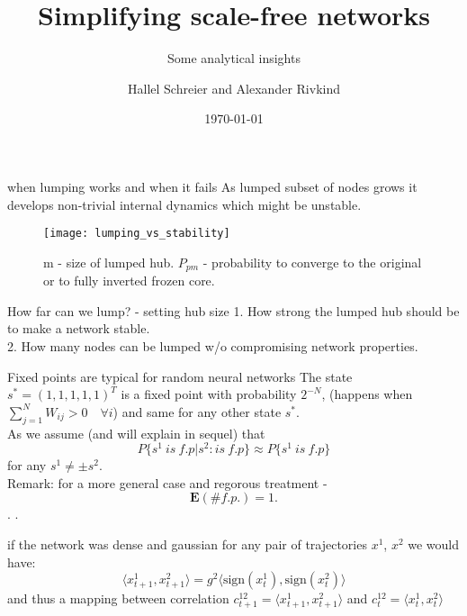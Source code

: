 \documentclass[xcolor=x11names,compress]{beamer}
\renewcommand{\(}{\begin{columns}}
\renewcommand{\)}{\end{columns}}
\newcommand{\<}[1]{\begin{column}{#1}}
\renewcommand{\>}{\end{column}}
\newcommand{\sign}{\mathrm{sign}}
\begin{document}
	
	
	\begin{frame}{}
		\title{Simplifying scale-free networks}
		\subtitle[short]{Some analytical insights}
		\author{
			Hallel Schreier and Alexander Rivkind}
		\date{\today}
		\titlepage
	\end{frame}
	
	
	\begin{frame}{when lumping works and when it fails}
	 As lumped subset of nodes grows it develops non-trivial internal dynamics which might be unstable.
		 \begin{figure}
		\centering
		\texttt{[image: lumping\_vs\_stability]}
		\caption[Stability of frozen core]{m - size of lumped hub. $P_{pm}$ - probability to converge to the original or to fully inverted frozen core.}
		\label{fig:lumpingvsstability}
		\end{figure}
  	\end{frame}
	
	\begin{frame}[t]{How far can we lump?  - setting hub size}
		1. How strong the lumped hub should be to make a network stable.\\
		2. How many nodes can be lumped w/o compromising network properties. 
	\end{frame}	
	
	\begin{frame}[t]{Fixed points are typical for random neural networks}
		The state $s^*=(1,1,1,1,1)^T$ is a fixed point with probability $2^{-N}$, (happens when $\sum_{j=1}^{N} W_{ij}  >0 \quad \forall i $) and same for any other state $s^*$. \\
		As we assume (and will explain in sequel) that \[P\{s^1\:is\:f.p|s^2:is\:f.p \} \approx P\{s^1\:is\:f.p \}\] for any $s^1\ne\pm s^2$.\\
		Remark: for a more general case and regorous treatment - 
		 \[ \mathbf{E}(\#f.p.)=1.\]. 
		 \cite{mori_PhysRevLett.119.028301}.\\
	\end{frame}
	
	\begin{frame}[t]{if the network was dense and gaussian}
		for any pair of trajectories $x^1$, $x^2$ we would have:
		\[
		\langle
		x^{1}_{t+1},x^{2}_{t+1}
		\rangle
		=g^2
		\langle
		\sign (x^{1}_{t}),\sign(x^{2}_{t})
		\rangle
		\] 
		and thus a mapping between correlation $c^{12}_{t+1}=\langle x^{1}_{t+1},x^{2}_{t+1}\rangle$ and $c^{12}_{t}=\langle x^{1}_{t},x^{2}_{t}\rangle$
	\end{frame}
	
\end{document}
